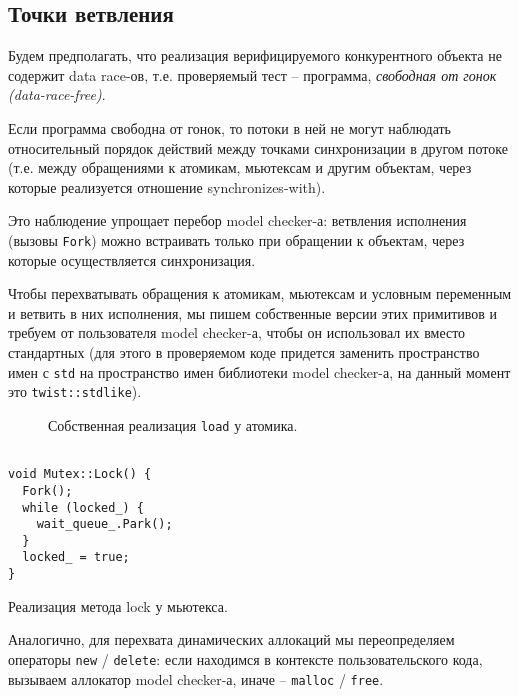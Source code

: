 \subsection{Точки ветвления}

Будем предполагать, что реализация верифицируемого конкурентного объекта не содержит data race-ов, т.е. проверяемый тест – программа, \emph{свободная от гонок (data-race-free)}. 

Если программа свободна от гонок, то потоки в ней не могут наблюдать относительный порядок действий между точками синхронизации в другом потоке (т.е. между обращениями к атомикам, мьютексам и другим объектам, через которые реализуется отношение synchronizes-with).

Это наблюдение упрощает перебор model checker-а: ветвления исполнения (вызовы \texttt{Fork}) можно встраивать только при обращении к объектам, через которые осуществляется синхронизация.

Чтобы перехватывать обращения к атомикам, мьютексам и условным переменным и ветвить в них исполнения, мы пишем собственные версии этих примитивов и требуем от пользователя model checker-а, чтобы он использовал их вместо стандартных (для этого в проверяемом коде придется заменить пространство имен с \texttt{std} на пространство имен библиотеки model checker-а, на данный момент это \texttt{twist::stdlike}).


\begin{figure}
	\bigskip
	\caption{Собственная реализация \texttt{load} у атомика.}\label{fig:lock}
\end{figure}

\else

\begin{listing}
	\centering
	
	\begin{verbatim}
    
void Mutex::Lock() {
  Fork();
  while (locked_) {
    wait_queue_.Park();
  }
  locked_ = true;
}

	\end{verbatim}
	\caption{Реализация метода lock у мьютекса.}
	\label{lock}
\end{listing}

\fi

Аналогично, для перехвата динамических аллокаций мы переопределяем операторы \texttt{new} / \texttt{delete}: если находимся в контексте пользовательского кода, вызываем аллокатор model checker-а, иначе – \texttt{malloc} / \texttt{free}.

